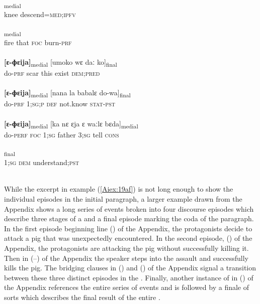 \documentclass[output=paper]{LSP/langsci}
\begin{document}
	\begin{exe}
\ex \label{Aiex:19af}
\begin{xlist}
\ex \label{Aiex:19a}
\gll [gulu	tila=nɛgɛː]\textsubscript{medial}\\
knee	descend\textsc{=med;ipfv}\\
\glt {}\\
\ex \label{Aiex:19b}
\textsubscript{medial}\\
fire	that	\textsc{foc}	burn\textsc{-prf}\\
\glt {}\\
\ex \label{Aiex:19c}
\gll \textbf{[ɛ-ɸɛija]}\textsubscript{medial}	[umoko	wɛ	daː	ko]\textsubscript{final}\\
do\textsc{-prf}	scar	this	exist	\textsc{dem;pred}\\
\glt {}\\
\ex \label{Aiex:19d}
\gll \textbf{[ɛ-ɸɛija]}\textsubscript{medial}	[nana	la	babalɛ	do-wa]\textsubscript{final}\\
do\textsc{-prf}	\textsc{1;sg;p}	\textsc{def}	not.know	\textsc{stat-pst}\\
\glt {}\\
\ex \label{Aiex:19e}
\gll \textbf{[ɛ-ɸɛija]}\textsubscript{medial}	[ka	nɛ	ɛja	ɛ	waːlɛ	bɛda]\textsubscript{medial}\\
do-\textsc{perf}	\textsc{foc}	\textsc{1;sg}	father	\textsc{3;sg}	tell	\textsc{cons}\\
\glt {}\\
\ex \label{Aiex:19f}
\textsubscript{final}\\
\textsc{1;sg}	\textsc{dem}	understand\textsc{;pst}\\
\glt {}\\
\end{xlist}
\end{exe}

	While the excerpt in example (\ref{Aiex:19af}) is not long enough to show the individual episodes in the initial paragraph, a larger example drawn from the Appendix shows a long series of events broken into four discourse episodes which describe three stages of a  and a final episode marking the coda of the paragraph. In the first episode beginning line () of the Appendix, the protagonists decide to attack a pig that was unexpectedly encountered. In the second episode, () of the Appendix, the protagonists are attacking the pig without successfully killing it. Then in (--) of the Appendix the speaker steps into the assault and successfully kills the pig. The bridging clauses in () and () of the Appendix signal a transition between these three distinct episodes in the . Finally, another instance of  in () of the Appendix references the entire series of events and is followed by a finale of sorts which describes the final result of the entire .
	
\end{document}
